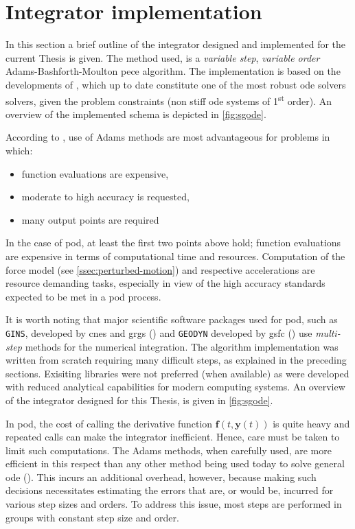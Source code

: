 \section{Integrator implementation}\label{sec:integrator-implementation}

In this section a brief outline of the integrator designed and implemented for 
the current Thesis is given. The method used, is a \emph{variable step}, 
\emph{variable order} Adams-Bashforth-Moulton \gls{pece} algorithm. The 
implementation is based on the developments of \cite{Shampine1975}, which up to 
date constitute one of the most robust \gls{ode} solvers solvers, given the 
problem constraints (non stiff \gls{ode} systems of 1\textsuperscript{st} order).
An overview of the implemented schema is depicted in \autoref{fig:sgode}.

According to \cite{Shampine1975}, use of Adams methods are most advantageous for 
problems in which:
\begin{itemize}
    \item function evaluations are expensive,
    \item moderate to high accuracy is requested,
    \item many output points are required
\end{itemize}

In the case of \gls{pod}, at least the first two points above hold; function 
evaluations are expensive in terms of computational time and resources. Computation 
of the force model (see \autoref{ssec:perturbed-motion}) and respective accelerations 
are resource demanding tasks, especially in view of the high accuracy standards 
expected to be met in a \gls{pod} process.

It is worth noting that  major scientific software packages used for \gls{pod}, such
as \texttt{GINS}, developed by \gls{cnes} and \gls{grgs} (\cite{Gins2013}) and 
\texttt{GEODYN} developed by \gls{gsfc} (\cite{Geodyn2015}) use \emph{multi-step} 
methods for the numerical integration. The algorithm implementation was written 
from scratch requiring many difficult steps, as explained in the preceding sections. 
Exisiting libraries were not preferred (when available) as were developed with 
reduced analytical capabilities for modern computing systems. An overview of the 
integrator designed for this Thesis, is given in \autoref{fig:sgode}. 

In \gls{pod}, the cost of calling the derivative function $\bm{f}(t, \bm{y}(t))$ 
is quite heavy and repeated calls can make the integrator inefficient. Hence, care 
must be taken to limit such computations. The Adams methods, when carefully used, 
are more efficient in this respect than any other method being used today to 
solve general \gls{ode} (\cite{Shampine1975}). This incurs an additional overhead,
however, because making such decisions necessitates estimating the errors that 
are, or would be, incurred for various step sizes and orders. To address this 
issue, most steps are performed in groups with constant step size and order.

